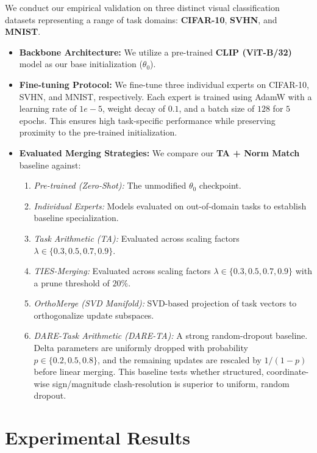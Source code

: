 \documentclass{article}
\begin{document}
We conduct our empirical validation on three distinct visual classification datasets representing a range of task domains: \textbf{CIFAR-10}, \textbf{SVHN}, and \textbf{MNIST}. 
\begin{itemize}
    \item \textbf{Backbone Architecture:} We utilize a pre-trained \textbf{CLIP (ViT-B/32)} model as our base initialization ($\theta_0$).
    \item \textbf{Fine-tuning Protocol:} We fine-tune three individual experts on CIFAR-10, SVHN, and MNIST, respectively. Each expert is trained using AdamW with a learning rate of $1e-5$, weight decay of $0.1$, and a batch size of $128$ for $5$ epochs. This ensures high task-specific performance while preserving proximity to the pre-trained initialization.
    \item \textbf{Evaluated Merging Strategies:} We compare our \textbf{TA + Norm Match} baseline against:
    \begin{enumerate}
        \item \textit{Pre-trained (Zero-Shot):} The unmodified $\theta_0$ checkpoint.
        \item \textit{Individual Experts:} Models evaluated on out-of-domain tasks to establish baseline specialization.
        \item \textit{Task Arithmetic (TA):} Evaluated across scaling factors $\lambda \in \{0.3, 0.5, 0.7, 0.9\}$.
        \item \textit{TIES-Merging:} Evaluated across scaling factors $\lambda \in \{0.3, 0.5, 0.7, 0.9\}$ with a prune threshold of $20\%$.
        \item \textit{OrthoMerge (SVD Manifold):} SVD-based projection of task vectors to orthogonalize update subspaces.
        \item \textit{DARE-Task Arithmetic (DARE-TA):} A strong random-dropout baseline. Delta parameters are uniformly dropped with probability $p \in \{0.2, 0.5, 0.8\}$, and the remaining updates are rescaled by $1/(1-p)$ before linear merging. This baseline tests whether structured, coordinate-wise sign/magnitude clash-resolution is superior to uniform, random dropout.
    \end{enumerate}
\end{itemize}

\section{Experimental Results}
\label{sec:results}
\end{document}
